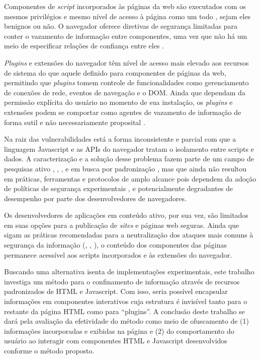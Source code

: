 \begin{alineas}
	\item Componentes de \textit{script} incorporados às páginas da web são executados com os mesmos privilégios e mesmo nível de acesso à página como um todo \cite[p. 2-3]{DeRyck2012}, sejam eles benignos ou não. O navegador oferece diretivas de segurança limitadas para conter o vazamento de informação entre componentes, uma vez que não há um meio de especificar relações de confiança entre eles \cite{Jang2010}.
	\item \textit{Plugins} e extensões do navegador têm nível de acesso mais elevado aos recursos de sistema do que aquele definido para componentes de páginas da web, permitindo que \textit{plugins} tomem controle de funcionalidades como gerenciamento de conexões de rede, eventos de navegação e o DOM. Ainda que dependam da permissão explícita do usuário no momento de sua instalação, os \textit{plugins} e extensões podem se comportar como agentes de vazamento de informação de forma sutil e não necessariamente proposital \cite{Heule2015}.
\end{alineas}

Na raiz das vulnerabilidades está a forma inconsistente e parcial com que a linguagem Javascript e as APIs do navegador tratam o isolamento entre scripts e dados. A caracterização e a solução desse problema fazem parte de um campo de pesquisas ativo \cite{Stefan2014}, \cite{Hedin2014}, \cite{Bichhawat2014}, \cite{Magazinius2014} e em busca por padronização \cite{W3C:WebAppSec}, mas que ainda não resultou em práticas, ferramentas e protocolos de amplo alcance pois dependem da adoção de políticas de segurança experimentais \cite{Hedin2014}, \cite{Bichhawat2014} e potencialmente degradantes de desempenho \cite[p. 14]{Stefan2014} por parte dos desenvolvedores de navegadores.

Os desenvolvedores de aplicações em conteúdo ativo, por sua vez, são limitados em suas opções para a publicação de \textit{sites} e páginas web seguras. Ainda que sigam as práticas recomendadas para a neutralização dos ataques mais comuns à segurança da informação (\cite{W3C:CORS}, \cite{W3C:SOP}, \cite{W3C:CSP}), o conteúdo dos componentes das páginas permanece acessível aos scripts incorporados e às extensões do navegador.

Buscando uma alternativa isenta de implementações experimentais, este trabalho investiga um método para o confinamento de informação através de recursos padronizados de HTML e Javascript. Com isso, seria possível encapsular informações em componentes interativos cuja estrutura é invisível tanto para o restante da página HTML como para ``plugins''. A conclusão deste trabalho se dará pela avaliação da efetividade do método como meio de ofuscamento de (1) informações incorporadas e exibidas na página e (2) do comportamento do usuário ao interagir com componentes HTML e Javascript desenvolvidos conforme o método proposto.

